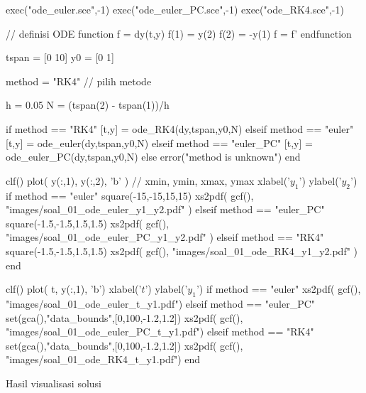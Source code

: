 \documentclass[10pt,bahasa]{article}
\begin{document}
\begin{scilabcode}
exec("ode_euler.sce",-1)
exec("ode_euler_PC.sce",-1)
exec("ode_RK4.sce",-1)

// definisi ODE
function f = dy(t,y)
  f(1) =  y(2)
  f(2) = -y(1)
  f = f'
endfunction
  
tspan = [0 10]
y0 = [0 1]
  
method = "RK4" // pilih metode
  
h = 0.05
N = (tspan(2) - tspan(1))/h
  
if method == "RK4"
  [t,y] = ode_RK4(dy,tspan,y0,N)
elseif method == "euler"
  [t,y] = ode_euler(dy,tspan,y0,N)
elseif method == "euler_PC"
  [t,y] = ode_euler_PC(dy,tspan,y0,N)  
else
  error("method is unknown")
end
  
clf()
plot( y(:,1), y(:,2), 'b' )
// xmin, ymin, xmax, ymax
xlabel('$y_1$')
ylabel('$y_2$')
if method == "euler"
  square(-15,-15,15,15)
  xs2pdf( gcf(), "images/soal_01_ode_euler_y1_y2.pdf" )
elseif method == "euler_PC"
  square(-1.5,-1.5,1.5,1.5)
  xs2pdf( gcf(), "images/soal_01_ode_euler_PC_y1_y2.pdf" )  
elseif method == "RK4"
  square(-1.5,-1.5,1.5,1.5)
  xs2pdf( gcf(), "images/soal_01_ode_RK4_y1_y2.pdf" )
end
  
clf()
plot( t, y(:,1), 'b')
xlabel('$t$')
ylabel('$y_1$')
if method == "euler"
  xs2pdf( gcf(), "images/soal_01_ode_euler_t_y1.pdf")
elseif method == "euler_PC"
  set(gca(),"data_bounds",[0,100,-1.2,1.2])
  xs2pdf( gcf(), "images/soal_01_ode_euler_PC_t_y1.pdf")  
elseif method == "RK4"
  set(gca(),"data_bounds",[0,100,-1.2,1.2])  
  xs2pdf( gcf(), "images/soal_01_ode_RK4_t_y1.pdf")
end
\end{scilabcode}

Hasil visualisasi solusi
\end{document}
